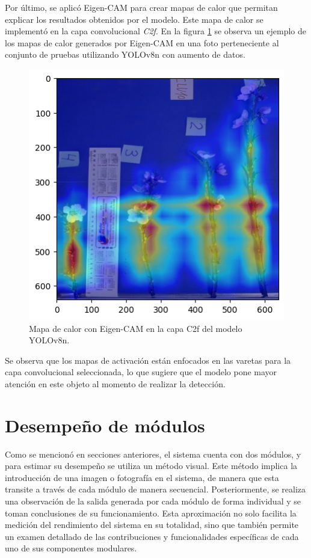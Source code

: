 Por último, se aplicó Eigen-CAM \cite{ARTICLE:17} para crear mapas de calor que permitan explicar los resultados obtenidos por el modelo. Este mapa de calor se implementó en la capa convolucional \textit{C2f}. En la figura \ref{fig:EigenCam} se observa un ejemplo de los mapas de calor generados por Eigen-CAM en una foto perteneciente al conjunto de pruebas utilizando YOLOv8n con aumento de datos.

\begin{figure}[ht]
	\centering
	\includegraphics[scale=0.55]{./Figures/EigenCamEj.png}
	\caption{Mapa de calor con Eigen-CAM en la capa C2f del modelo YOLOv8n.}
	\label{fig:EigenCam}
\end{figure}

Se observa que los mapas de activación están enfocados en las varetas para la capa convolucional seleccionada, lo que sugiere que el modelo pone mayor atención en este objeto al momento de realizar la detección.   

\section{Desempeño de módulos}
\label{sec:desempeñoModulos}

Como se mencionó en secciones anteriores, el sistema cuenta con dos módulos, y para estimar su desempeño se utiliza un método visual. Este método implica la introducción de una imagen o fotografía en el sistema, de manera que esta transite a través de cada módulo de manera secuencial. Posteriormente, se realiza una observación de la salida generada por cada módulo de forma individual y se toman conclusiones de su funcionamiento. Esta aproximación no solo facilita la medición del rendimiento del sistema en su totalidad, sino que también permite un examen detallado de las contribuciones y funcionalidades específicas de cada uno de sus componentes modulares.

